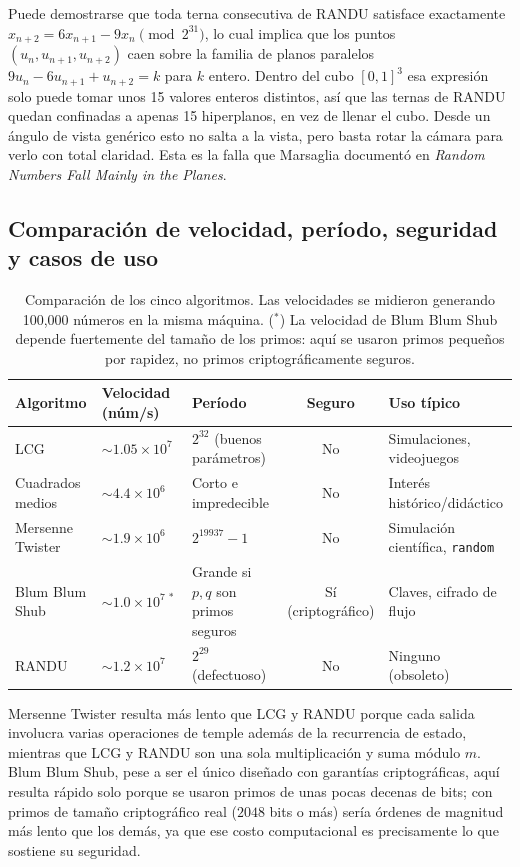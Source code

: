 \documentclass[11pt]{article}
\begin{document}
Puede demostrarse que toda terna consecutiva de RANDU satisface exactamente $x_{n+2} = 6x_{n+1} - 9x_n \pmod{2^{31}}$, lo cual implica que los puntos $(u_n, u_{n+1}, u_{n+2})$ caen sobre la familia de planos paralelos $9u_n - 6u_{n+1} + u_{n+2} = k$ para $k$ entero. Dentro del cubo $[0,1]^3$ esa expresión solo puede tomar unos 15 valores enteros distintos, así que las ternas de RANDU quedan confinadas a apenas 15 hiperplanos, en vez de llenar el cubo. Desde un ángulo de vista genérico esto no salta a la vista, pero basta rotar la cámara para verlo con total claridad. Esta es la falla que Marsaglia documentó en \emph{Random Numbers Fall Mainly in the Planes}.

\subsection{Comparación de velocidad, período, seguridad y casos de uso}

\begin{table}[H]
\centering
\small
\begin{tabularx}{\textwidth}{l X X c X}
\toprule
Algoritmo & Velocidad (núm/s) & Período & Seguro & Uso típico \\
\midrule
LCG & $\sim 1.05\times 10^{7}$ & $2^{32}$ (buenos parámetros) & No & Simulaciones, videojuegos \\
Cuadrados medios & $\sim 4.4\times 10^{6}$ & Corto e impredecible & No & Interés histórico/didáctico \\
Mersenne Twister & $\sim 1.9\times 10^{6}$ & $2^{19937}-1$ & No & Simulación científica, \texttt{random} \\
Blum Blum Shub & $\sim 1.0\times 10^{7 \ *}$ & Grande si $p,q$ son primos seguros & Sí (criptográfico) & Claves, cifrado de flujo \\
RANDU & $\sim 1.2\times 10^{7}$ & $2^{29}$ (defectuoso) & No & Ninguno (obsoleto) \\
\bottomrule
\end{tabularx}
\caption{Comparación de los cinco algoritmos. Las velocidades se midieron generando 100{,}000 números en la misma máquina. ($^*$) La velocidad de Blum Blum Shub depende fuertemente del tamaño de los primos: aquí se usaron primos pequeños por rapidez, no primos criptográficamente seguros.}
\end{table}

Mersenne Twister resulta más lento que LCG y RANDU porque cada salida involucra varias operaciones de temple además de la recurrencia de estado, mientras que LCG y RANDU son una sola multiplicación y suma módulo $m$. Blum Blum Shub, pese a ser el único diseñado con garantías criptográficas, aquí resulta rápido solo porque se usaron primos de unas pocas decenas de bits; con primos de tamaño criptográfico real ($2048$ bits o más) sería órdenes de magnitud más lento que los demás, ya que ese costo computacional es precisamente lo que sostiene su seguridad.
\end{document}
